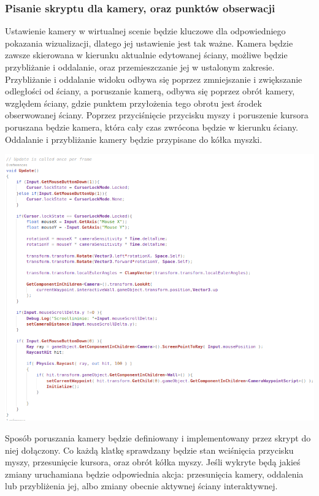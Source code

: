 \documentclass{article} %
\begin{document}
        \subsubsection*{Pisanie skryptu dla kamery, oraz punktów obserwacji}
            Ustawienie kamery w wirtualnej scenie będzie kluczowe dla odpowiedniego pokazania wizualizacji, dlatego jej ustawienie jest tak ważne. Kamera będzie zawsze skierowana w kierunku aktualnie edytowanej ściany, możliwe będzie przybliżanie i oddalanie, oraz przemieszczanie jej w ustalonym zakresie. Przybliżanie i oddalanie widoku odbywa się poprzez zmniejszanie i zwiększanie odległości od ściany, a poruszanie kamerą, odbywa się poprzez obrót kamery, względem ściany, gdzie punktem przyłożenia tego obrotu jest środek obserwowanej ściany.  Poprzez przyciśnięcie przycisku myszy i poruszenie kursora poruszana będzie kamera, która cały czas zwrócona będzie w kierunku ściany. Oddalanie i przybliżanie kamery będzie przypisane do kółka myszki.
            \\
            
        
            \begin{center}
                \includegraphics[scale=0.6,keepaspectratio=true]{images/screenshots/code/code_001.png}
            \end{center}
        
            Sposób poruszania kamery będzie definiowany i implementowany przez skrypt do niej dołączony. Co każdą klatkę sprawdzany będzie stan wciśnięcia przycisku myszy, przesunięcie kursora, oraz obrót kółka myszy. Jeśli wykryte będą jakieś zmiany uruchamiana będzie odpowiednia akcja: przesunięcia kamery, oddalenia lub przybliżenia jej, albo zmiany obecnie aktywnej ściany interaktywnej.
            \\
            
\end{document}
